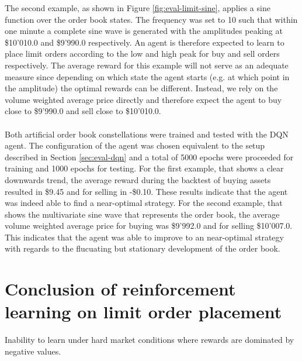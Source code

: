 The second example, as shown in Figure \ref{fig:eval-limit-sine}, applies a sine function over the order book states.
The frequency was set to 10 such that within one minute a complete sine wave is generated with the amplitudes peaking at \$10'010.0 and \$9'990.0 respectively.
An agent is therefore expected to learn to place limit orders according to the low and high peak for buy and sell orders respectively.
The average reward for this example will not serve as an adequate measure since depending on which state the agent starts (e.g. at which point in the amplitude) the optimal rewards can be different.
Instead, we rely on the volume weighted average price directly and therefore expect the agent to buy close to \$9'990.0 and sell close to \$10'010.0.
\\
\\
Both artificial order book constellations were trained and tested with the DQN agent.
The configuration of the agent was chosen equivalent to the setup described in Section \ref{sec:eval-dqn} and a total of 5000 epochs were proceeded for training and 1000 epochs for testing.
For the first example, that shows a clear downwards trend, the average reward during the backtest of buying assets resulted in \$9.45 and for selling in -\$0.10.
These results indicate that the agent was indeed able to find a near-optimal strategy.
For the second example, that shows the multivariate sine wave that represents the order book, the average volume weighted average price for buying was \$9'992.0 and for selling \$10'007.0.
This indicates that the agent was able to improve to an near-optimal strategy with regards to the flucuating but stationary development of the order book.

\section{Conclusion of reinforcement learning on limit order placement}

Inability to learn under hard market conditions where rewards are dominated by negative values.

